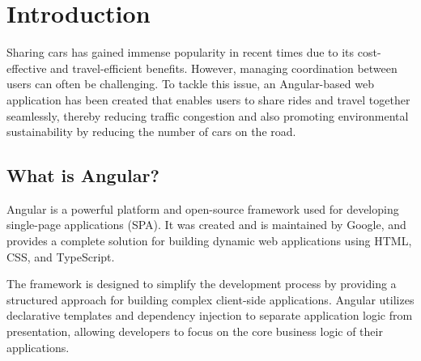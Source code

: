 \documentclass{article}
\title{\papertitle}
\begin{document}
%
\capstartfalse
\maketitle
\capstarttrue

\tableofcontents

%
\begin{abstract}
    In this write-up, we will be discussing Angular, a framework and platform that enables the development of client-side single-page applications (SPA) through the use of TypeScript and HTML. Additionally, we will provide a hands-on demonstration of how to create a web application using Angular, specifically one that allows for car sharing and ride-sharing. The platform enables users to publish travel routes and fares, while others can join in. However, it's important to mention that the application's implementation is based on dummy data and can only be accessed through the frontend.
\end{abstract}
%

\section{Introduction}\label{sec:introduction}

    Sharing cars has gained immense popularity in recent times due to its cost-effective and travel-efficient benefits. However, managing coordination between users can often be challenging. To tackle this issue, an Angular-based web application has been created that enables users to share rides and travel together seamlessly, thereby reducing traffic congestion and also promoting environmental sustainability by reducing the number of cars on the road.

\subsection{What is Angular?}
    Angular is a powerful platform and open-source framework used for developing single-page applications (SPA). It was created and is maintained by Google, and provides a complete solution for building dynamic web applications using HTML, CSS, and TypeScript.

    The framework is designed to simplify the development process by providing a structured approach for building complex client-side applications. Angular utilizes declarative templates and dependency injection to separate application logic from presentation, allowing developers to focus on the core business logic of their applications.
\end{document}
